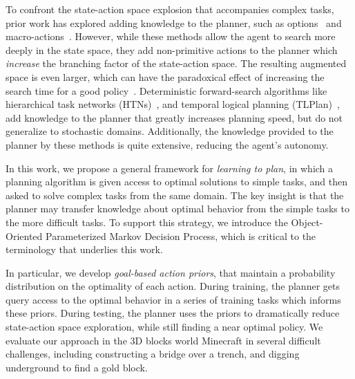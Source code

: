 \documentclass[11pt]{article}
\begin{document}
To confront the state-action space explosion that accompanies complex tasks, prior work has explored adding knowledge to the planner, such as options~\cite{sutton99} and macro-actions~\cite{Botea:2005kx,Newton:2005vn}.  However, while these methods allow the agent to search more deeply in the state space, they add non-primitive actions to the planner which {\em increase} the branching factor of the state-action space.  The resulting augmented space is even larger, which can have the paradoxical effect of increasing the search time for a good policy~\cite{Jong:2008zr}. Deterministic forward-search algorithms like hierarchical task networks (HTNs)~\cite{Nau:1999:SSH:1624312.1624357}, and temporal logical planning (TLPlan)~\cite{Bacchus95usingtemporal,Bacchus99usingtemporal}, add knowledge to the planner that greatly increases planning speed, but do not generalize to stochastic domains. Additionally, the knowledge provided to the planner by these methods is quite extensive, reducing the agent's autonomy.

In this work, we propose a general framework for {\it learning to plan}, in which a planning algorithm is given access to optimal solutions to simple tasks, and then asked to solve complex tasks from the same domain. The key insight is that the planner may transfer knowledge about optimal behavior from the simple tasks to the more difficult tasks. To support this strategy, we introduce the Object-Oriented Parameterized Markov Decision Process, which is critical to the terminology that underlies this work.

In particular, we develop {\it goal-based action priors}, that maintain a probability distribution on the optimality of each action. During training, the planner gets query access to the optimal behavior in a series of training tasks which informs these priors. During testing, the planner uses the priors to dramatically reduce state-action space exploration, while still finding a near optimal policy. We evaluate our approach in the 3D blocks world Minecraft in several difficult challenges, including constructing a bridge over a trench, and digging underground to find a gold block.
\end{document}
